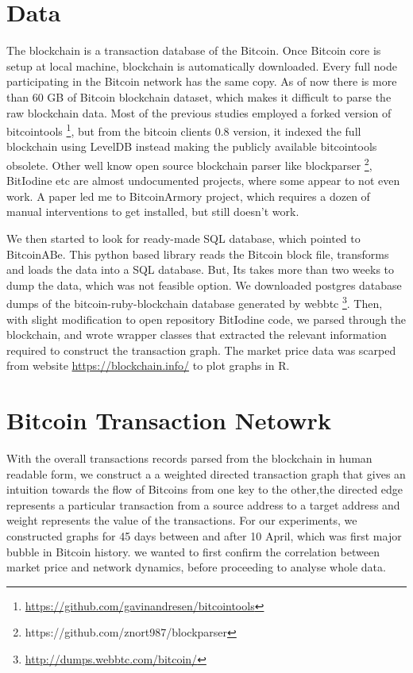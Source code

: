 \documentclass[12pt,a4paper]{article}
\numberwithin{equation}{section}
\numberwithin{figure}{section}
\numberwithin{table}{section}
\begin{document}
\section{Data}
\label{sec:data}

The blockchain is a transaction database of the Bitcoin.  Once Bitcoin core is setup at local machine, blockchain is automatically downloaded. Every full node participating in the Bitcoin network has the same copy. As of now there is more than 60 GB of Bitcoin blockchain dataset, which makes it difficult to parse the raw blockchain data. Most of the previous studies \citep{Ron2013} employed a forked version of bitcointools \footnote{\url{https://github.com/gavinandresen/bitcointools}}, but from the bitcoin clients 0.8 version, it indexed the full blockchain using LevelDB instead making the publicly available bitcointools obsolete. Other well know open source blockchain parser like blockparser \footnote{https://github.com/znort987/blockparser}, BitIodine \citep{Spagnuolo2013} etc are almost undocumented projects, where some appear to not even work. A paper \citep{Fleder2015} led me to BitcoinArmory project, which requires a dozen of manual interventions to get installed, but still doesn’t work.

We then started to look for ready-made SQL database, which pointed to BitcoinABe. This python based library reads the Bitcoin block file, transforms and loads the data into a SQL database. But, Its takes more than two weeks to dump the data, which was not feasible option. We downloaded postgres database dumps of the bitcoin-ruby-blockchain database generated by webbtc \footnote{\url{http://dumps.webbtc.com/bitcoin/}}. Then, with slight modification to open repository BitIodine \citep{Spagnuolo2013} code, we parsed through the blockchain, and wrote wrapper classes that extracted the relevant information required to construct the transaction graph. The market price data was scarped from website \url {https://blockchain.info/} to plot graphs in R.

\section{Bitcoin Transaction Netowrk}

With the overall transactions records parsed from the blockchain in human readable form, we construct a a weighted directed transaction graph that gives an intuition towards the flow of Bitcoins from one key to the other,the directed edge represents a particular transaction from a source address to a target address and weight represents the value of the transactions. For our experiments, we constructed graphs for 45 days between and after 10 April, which was first major bubble in Bitcoin history. we wanted to first confirm the correlation between market price and network dynamics, before proceeding to analyse whole data.
\end{document}
